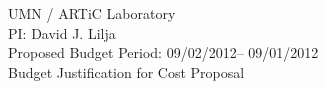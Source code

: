 \def\piA{David J. Lilja}
\def\numRAs{2}
\def\pilist{PI: \piA}
\def\thisyear{2012}
\def\startdate{09/02/2012}
\def\enddate{09/01/2012}
\def\phdstipend{\$2,125/mo }
\def\mscstipend{\$1,940/mo }
\def\studraise{4\% }
\def\salaryallocationrate{8.34\%} %
\def\employeebenefitrate{27.0\% }
\def\vacationaccrualrate{9.5\% }
\def\networkservicescost{\$100/person/month }
\def\networkfacilitycharges{\$150/person/month} %
\def\MITninemonthtuition{\$33,400} %
\def\MITtuitioninflator{4\% }
\def\MITtuitionsubsidy{45\% }
\def\MITtuitioncharge{55\% }
\def\msAllocation{1.24\%}
\def\facostinception{07/01/2006} %
\def\facostrate{65\% }

\renewcommand{\theenumi}{\Alph{enumi}}
\renewcommand{\theenumii}{\arabic{enumii}}

\vspace*{1.0in}
\begin{center}
{\large
UMN / ARTiC Laboratory \\
\pilist \\
Proposed Budget Period: \startdate -- \enddate \\
Budget Justification for Cost Proposal
}
\end{center}

